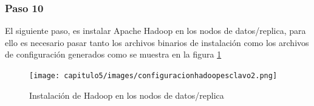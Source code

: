 \subsubsection{Paso 10}
El siguiente paso, es instalar Apache Hadoop en los nodos de datos/replica, para ello es necesario pasar tanto los archivos binarios de instalación como los archivos de configuración generados como se muestra en la figura \ref{fig:pasarhadoop} 
\begin{figure}[H]
	\hypertarget{fig:pasarhadoop}{\hspace{1pt}}
	\begin{center}	
		\texttt{[image: capitulo5/images/configuracionhadoopesclavo2.png]}
		\caption{Instalación de Hadoop en los nodos de datos/replica}
		\label{fig:pasarhadoop}
	\end{center}
\end{figure}

